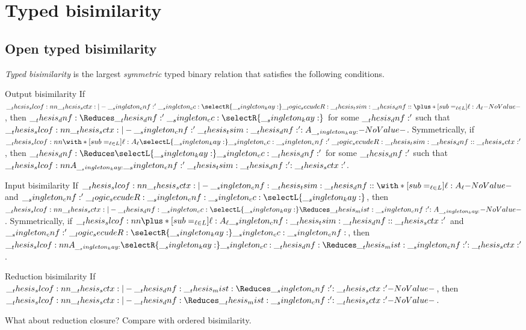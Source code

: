 \chapter{Typed bisimilarity}\label{ch:typed-bisim}

\section{Open typed bisimilarity}

\begin{definition}
  \emph{Typed bisimilarity} is the largest \emph{symmetric} typed binary relation that satisfies the following conditions.
  \begin{thmdescription}
  \item[Output bisimilarity]
    If $\slcof{\sctx |- \cnf' \cc \selectR{\kay} \secudeR\tsim \dnf : \plus*[sub=_{\ell \in L}]{\ell:A_{\ell}}}$, then $\dnf \Reduces \dnf' \cc \selectR{\kay}$ for some $\__thesis_dnf:'$ such that $\slcof{\sctx |- \cnf' \tsim \dnf' : A_{\kay}}$.
    Symmetrically, if $\slcof{\with*[sub=_{\ell \in L}]{\ell:A_{\ell}} |- \selectL{\kay} \cc \cnf' \secudeR\tsim \dnf : \sctx'}$, then $\dnf \Reduces \selectL{\kay} \cc \dnf'$ for some $\__thesis_dnf:'$ such that $\slcof{A_{\kay} |- \cnf' \tsim \dnf' : \sctx'}$.

  \item[Input bisimilarity]
    If $\slcof{\sctx |- \cnf \tsim \dnf : \with*[sub=_{\ell \in L}]{\ell:A_{\ell}}}$ and $\cnf' \secudeR \cnf \cc \selectL{\kay}$, then $\slcof{\sctx |- \dnf \cc \selectL{\kay} \Reduces\mist \cnf' : A_{\kay}}$.
    Symmetrically, if $\slcof{\plus*[sub=_{\ell \in L}]{\ell:A_{\ell}} |- \cnf \tsim \dnf : \sctx'}$ and $\cnf' \secudeR \selectR{\kay} \cc \cnf$, then $\slcof{A_{\kay} |- \selectR{\kay} \cc \dnf \Reduces\mist \cnf' : \sctx'}$.

  \item[Reduction bisimilarity]
    If $\slcof{\sctx |- \dnf \mist\Reduces \cnf' : \sctx'}$, then $\slcof{\sctx |- \dnf \Reduces\mist \cnf' : \sctx'}$.
  \end{thmdescription}
\end{definition}

What about reduction closure?
Compare with ordered bisimilarity.




